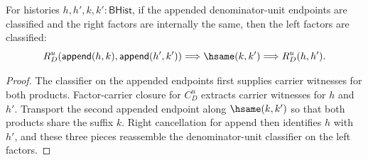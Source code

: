 \begin{theorem}
\label{thm:rat-denom-unit-classifier-append-right-factor-classifier}
For histories $h,h',k,k':\mathsf{BHist}$, if the appended denominator-unit
endpoints are classified and the right factors are internally the same, then
the left factors are classified:
$$
R_D^u(\mathsf{append}(h,k),\mathsf{append}(h',k'))
\Longrightarrow
\hsame(k,k')
\Longrightarrow
R_D^u(h,h').
$$
\end{theorem}
\begin{proof}
The classifier on the appended endpoints first supplies carrier witnesses for
both products. Factor-carrier closure for $C_D^u$ extracts carrier witnesses
for $h$ and $h'$. Transport the second appended endpoint along
$\hsame(k,k')$ so that both products share the suffix $k$. Right cancellation
for append then identifies $h$ with $h'$, and these three pieces reassemble
the denominator-unit classifier on the left factors.
\end{proof}

